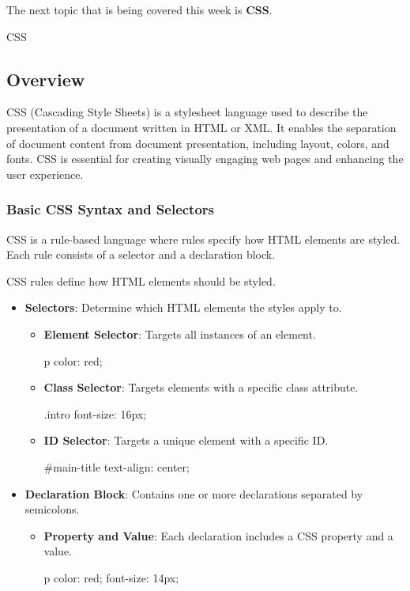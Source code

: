 The next topic that is being covered this week is \textbf{CSS}.

\begin{notes}{CSS}
    \subsection*{Overview}

    CSS (Cascading Style Sheets) is a stylesheet language used to describe the presentation of a document written in HTML or XML. It enables the separation of document content from document presentation, including layout, colors, and fonts. CSS is essential for creating visually engaging web pages and enhancing the user experience.
    
    \subsubsection*{Basic CSS Syntax and Selectors}
    
    CSS is a rule-based language where rules specify how HTML elements are styled. Each rule consists of a selector and a declaration block.
    
    \begin{highlight}
    
        CSS rules define how HTML elements should be styled.
        
        \begin{itemize}
            \item \textbf{Selectors}: Determine which HTML elements the styles apply to.
            \begin{itemize}
                \item \textbf{Element Selector}: Targets all instances of an element.
    \begin{code}[CSS]
    p {
        color: red;
    }
    \end{code}
                \item \textbf{Class Selector}: Targets elements with a specific class attribute.
    \begin{code}[CSS]
    .intro {
        font-size: 16px;
    }
    \end{code}
                \item \textbf{ID Selector}: Targets a unique element with a specific ID.
    \begin{code}[CSS]
    #main-title {
        text-align: center;
    }
    \end{code}
            \end{itemize}
            \item \textbf{Declaration Block}: Contains one or more declarations separated by semicolons.
            \begin{itemize}
                \item \textbf{Property and Value}: Each declaration includes a CSS property and a value.
    \begin{code}[CSS]
    p {
        color: red;
        font-size: 14px;
    }
    \end{code}
            \end{itemize}
        \end{itemize}
    

\end{highlight}
\end{notes}

